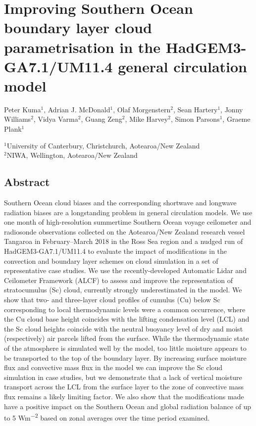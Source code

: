 \chapter{Improving Southern Ocean boundary layer cloud para\-metrisation in the HadGEM3-GA7.1/UM11.4 general circulation model}

\vspace{-0.1cm}
\sffamily
\linespread{1.6}
\raggedright
Peter Kuma$^1$, Adrian J. McDonald$^1$, Olaf Morgenstern$^2$, Sean Hartery$^1$, Jonny Williams$^2$, Vidya Varma$^2$, Guang Zeng$^2$, Mike Harvey$^2$, Simon Parsons$^1$, Graeme Plank$^1$
\footnotesize

\linespread{1}
\vspace{0.2cm}
\noindent
$^1$University of Canterbury, Christchurch, Aotearoa/New Zealand\\
$^2$NIWA, Wellington, Aotearoa/New Zealand
\normalsize
\normalfont
\justify

\section*{Abstract}

Southern Ocean cloud biases and the corresponding shortwave and longwave radiation
biases are a longstanding problem in general circulation models. We use one month of high-resolution summertime
Southern Ocean voyage ceilometer and radiosonde observations collected on the Aotearoa/New Zealand research vessel Tangaroa in February--March
2018 in the Ross Sea region
and a nudged run of HadGEM3-GA7.1/UM11.4 to
evaluate the impact of modifications in the convection and boundary layer
schemes on cloud simulation in a set of representative case studies. We use the recently-developed Automatic Lidar and Ceilometer Framework (ALCF) to assess and improve the representation of stratocumulus (Sc) cloud,
currently strongly underestimated in the model. We show that two- and three-layer cloud
profiles of cumulus (Cu) below Sc corresponding to local thermodynamic levels were a common occurrence, where
the Cu cloud base height coincides with the lifting condensation level (LCL)
and the Sc cloud heights coincide with the neutral buoyancy level of dry and moist (respectively) air
parcels lifted from the surface.
While the thermodynamic state of the atmosphere is simulated
well by the model, too little moisture appears to be transported to the top of the boundary layer. By increasing surface moisture flux and convective mass flux in the model we can improve the Sc cloud simulation in case studies, but we demonstrate that a lack of vertical moisture transport
across the LCL from the surface layer to the zone of convective mass flux remains a likely limiting factor.
We also show that the modifications made have a positive impact on the Southern Ocean and
global radiation balance of up to 5 \unit{Wm^{-2}} based on zonal averages over the time period examined.


